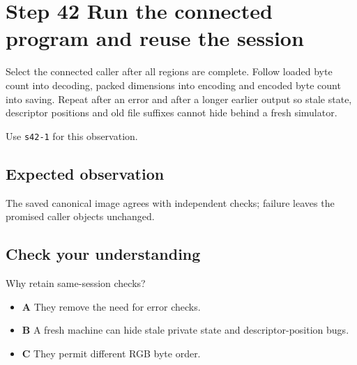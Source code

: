 \section{Step 42 Run the connected program and reuse the session}\label{ppm-s42}

Select the connected caller after all regions are complete. Follow loaded byte count into decoding, packed dimensions into encoding and encoded byte count into saving. Repeat after an error and after a longer earlier output so stale state, descriptor positions and old file suffixes cannot hide behind a fresh simulator.

Use \texttt{s42-1} for this observation.

\subsection{Expected observation}
The saved canonical image agrees with independent checks; failure leaves the promised caller objects unchanged.

\subsection{Check your understanding}
Why retain same-session checks?

\begin{itemize}
\item \textbf{A} They remove the need for error checks.
\item \textbf{B} A fresh machine can hide stale private state and descriptor-position bugs.
\item \textbf{C} They permit different RGB byte order.
\end{itemize}

